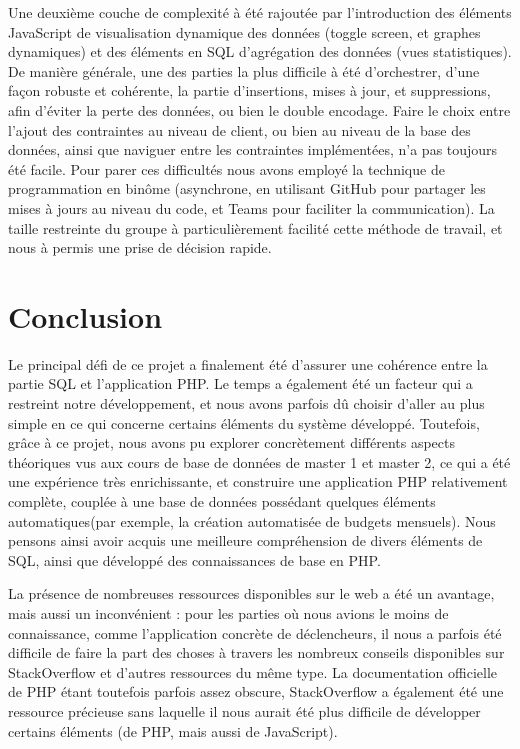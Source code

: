 \documentclass[a4paper,12pt]{article}
\begin{document}
Une deuxième couche de complexité à été rajoutée par l'introduction des éléments JavaScript de visualisation dynamique des données (toggle screen, et graphes dynamiques) et des éléments en SQL d'agrégation des données (vues statistiques).
De manière générale, une des parties la plus difficile à été d'orchestrer, d'une façon robuste et cohérente, la partie d'insertions, mises à jour, et suppressions, afin d'éviter la perte des données, ou bien le double encodage.
Faire le choix entre l'ajout des contraintes au niveau de client, ou bien au niveau de la base des données, ainsi que naviguer entre les contraintes implémentées, n'a pas toujours été facile.
Pour parer ces difficultés nous avons employé la technique de programmation en binôme (asynchrone, en utilisant GitHub pour partager les mises à jours au niveau du code, et Teams pour faciliter la communication).
La taille restreinte du groupe à particulièrement facilité cette méthode de travail, et nous à permis une prise de décision rapide.

\newpage
\section{Conclusion}

Le principal défi de ce projet a finalement été d'assurer une cohérence entre la partie SQL et l'application PHP.
Le temps a également été un facteur qui a restreint notre développement, et nous avons parfois dû choisir d'aller au plus simple en ce qui concerne certains éléments du système développé.
Toutefois, grâce à ce projet, nous avons pu explorer concrètement différents aspects théoriques vus aux cours de base de données de master 1 et master 2, ce qui a été une expérience très enrichissante, et construire une application PHP relativement complète, couplée à une base de données possédant quelques éléments \og automatiques\fg (par exemple, la création automatisée de budgets mensuels). Nous pensons ainsi avoir acquis une meilleure compréhension de divers éléments de SQL, ainsi que développé des connaissances de base en PHP.

La présence de nombreuses ressources disponibles sur le web a été un avantage, mais aussi un inconvénient : pour les parties où nous avions le moins de connaissance, comme l'application concrète de déclencheurs, il nous a parfois été difficile de faire la part des choses à travers les nombreux conseils disponibles sur StackOverflow et d'autres ressources du même type.
La documentation officielle de PHP étant toutefois parfois assez obscure, StackOverflow a également été une ressource précieuse sans laquelle il nous aurait été plus difficile de développer certains éléments (de PHP, mais aussi de JavaScript).
\end{document}
